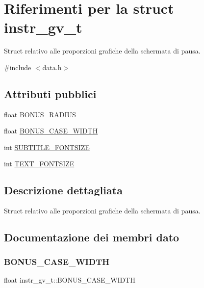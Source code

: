 \hypertarget{structinstr__gv__t}{}\section{Riferimenti per la struct instr\+\_\+gv\+\_\+t}
\label{structinstr__gv__t}


Struct relativo alle proporzioni grafiche della schermata di pausa.  




{\ttfamily \#include $<$data.\+h$>$}

\subsection*{Attributi pubblici}
\begin{DoxyCompactItemize}
\item 
float \hyperlink{structinstr__gv__t_aadedcf5c3f9a7db3eb3214dc3aa961f7}{B\+O\+N\+U\+S\+\_\+\+R\+A\+D\+I\+US}
\item 
float \hyperlink{structinstr__gv__t_a7a92d03fee7f41bdbd681bb8342a35f8}{B\+O\+N\+U\+S\+\_\+\+C\+A\+S\+E\+\_\+\+W\+I\+D\+TH}
\item 
int \hyperlink{structinstr__gv__t_a552dc4715b763b4b5188d36ac2a06794}{S\+U\+B\+T\+I\+T\+L\+E\+\_\+\+F\+O\+N\+T\+S\+I\+ZE}
\item 
int \hyperlink{structinstr__gv__t_a44f052a2fd3ef87d6974c592945fdbaa}{T\+E\+X\+T\+\_\+\+F\+O\+N\+T\+S\+I\+ZE}
\end{DoxyCompactItemize}


\subsection{Descrizione dettagliata}
Struct relativo alle proporzioni grafiche della schermata di pausa. 

\subsection{Documentazione dei membri dato}
\mbox{\label{structinstr__gv__t_a7a92d03fee7f41bdbd681bb8342a35f8}} 
\subsubsection{\texorpdfstring{B\+O\+N\+U\+S\+\_\+\+C\+A\+S\+E\+\_\+\+W\+I\+D\+TH}{BONUS\_CASE\_WIDTH}}
{\footnotesize\ttfamily float instr\+\_\+gv\+\_\+t\+::\+B\+O\+N\+U\+S\+\_\+\+C\+A\+S\+E\+\_\+\+W\+I\+D\+TH}


